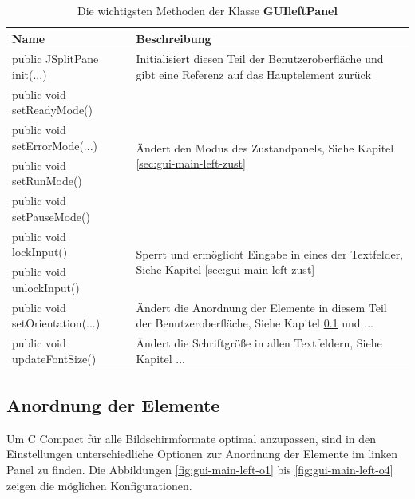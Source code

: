 \def\arraystretch{1.6}
\begin{table}
\begin{tabularx}{\columnwidth}{l|p{9cm}}
\textbf{Name}&\textbf{Beschreibung}\\
\hline
\hline
public JSplitPane init(...)&Initialisiert diesen Teil der Benutzeroberfläche und gibt eine Referenz auf das Hauptelement zurück\\
\hline
public void setReadyMode()&\multirow{4}{*}{\parbox{9cm}{Ändert den Modus des Zustandpanels, Siehe Kapitel \ref{sec:gui-main-left-zust}}}\\
public void setErrorMode(...)&\\
public void setRunMode()&\\
public void setPauseMode()&\\
\hline
public void lockInput()&\multirow{2}{*}{\parbox{9cm}{Sperrt und ermöglicht Eingabe in eines der Textfelder, Siehe Kapitel \ref{sec:gui-main-left-zust}}}\\
public void unlockInput()&\\
\hline
public void setOrientation(...)&Ändert die Anordnung der Elemente in diesem Teil der Benutzeroberfläche, Siehe Kapitel \ref{sec:gui-main-left-ord} und ...\\
\hline
public void updateFontSize()&Ändert die Schriftgröße in allen Textfeldern, Siehe Kapitel ...
\end{tabularx}
\caption{Die wichtigsten Methoden der Klasse \textbf{GUIleftPanel}}\label{tab:gui-main-left-methods}
\end{table}

\subsection{Anordnung der Elemente}
\label{sec:gui-main-left-ord}

Um C Compact für alle Bildschirmformate optimal anzupassen, sind in den Einstellungen unterschiedliche Optionen zur Anordnung der Elemente im linken Panel zu finden. Die Abbildungen \ref{fig:gui-main-left-o1} bis \ref{fig:gui-main-left-o4} zeigen die möglichen Konfigurationen.

